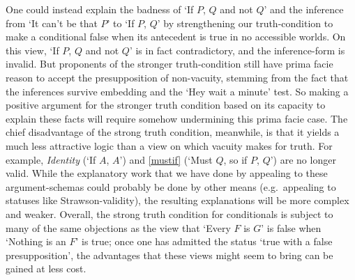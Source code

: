 \documentclass[If.tex]{subfiles}
\begin{document}
One could instead explain the badness of ‘If $P$, $Q$ and not $Q$’ and the inference from ‘It can't be that $P$’ to ‘If $P$, $Q$’ by strengthening our truth-condition to make a conditional false when its antecedent is true in no accessible worlds.  On this view, ‘If $P$, $Q$ and not $Q$’ is in fact contradictory, and the inference-form is invalid.  But proponents of the stronger truth-condition still have prima facie reason to accept the presupposition of non-vacuity, stemming from the fact that the inferences survive embedding and the ‘Hey wait a minute’ test.  So making a positive argument for the stronger truth condition based on its capacity to explain these facts will require somehow undermining this prima facie case.  The chief disadvantage of the strong truth condition, meanwhile, is that it yields a much less attractive logic than a view on which vacuity makes for truth.  For example, \emph{Identity} (‘If $A$, $A$’) and \ref{mustif} (‘Must $Q$, so if $P$, $Q$’) are no longer valid.  While the explanatory work that we have done by appealing to these argument-schemas could probably be done by other means (e.g.\ appealing to statuses like Strawson-validity), the resulting explanations will be more complex and weaker.  Overall, the strong truth condition for conditionals is subject to many of the same objections as the view that ‘Every $F$ is $G$’ is false when ‘Nothing is an $F$’ is true; once one has admitted the status ‘true with a false presupposition’, the advantages that these views might seem to bring can be gained at less cost.
\end{document}
